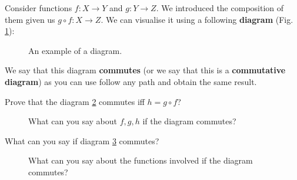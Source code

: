 Consider functions $f:X\to Y$ and $g:Y\to Z$. We introduced the composition of them given us $g\circ f: X\to Z$. We can visualise it using a following \textbf{diagram} (Fig. \ref{fig:commutative_diagram_intro}):

\begin{figure}
  \centering
  \caption{An example of a diagram.}
  \label{fig:commutative_diagram_intro}
\end{figure}

We say that this diagram \textbf{commutes} (or we say that this is a \textbf{commutative diagram}) as you can use follow any path and obtain the same result.

\begin{exercise}
  Prove that the diagram \ref{fig:commutative_diagram_composition} commutes iff $h=g\circ f$?

  \begin{figure}
    \centering

    \caption{What can you say about $f,g,h$ if the diagram commutes?}
    \label{fig:commutative_diagram_composition}

  \end{figure}
\end{exercise}

\begin{exercise}
  What can you say if diagram \ref{fig:commutative_diagram_toy_natural_transformation} commutes?

  \begin{figure}
    \centering

    \caption{What can you say about the functions involved if the diagram commutes?}
    \label{fig:commutative_diagram_toy_natural_transformation}

  \end{figure}
\end{exercise}
